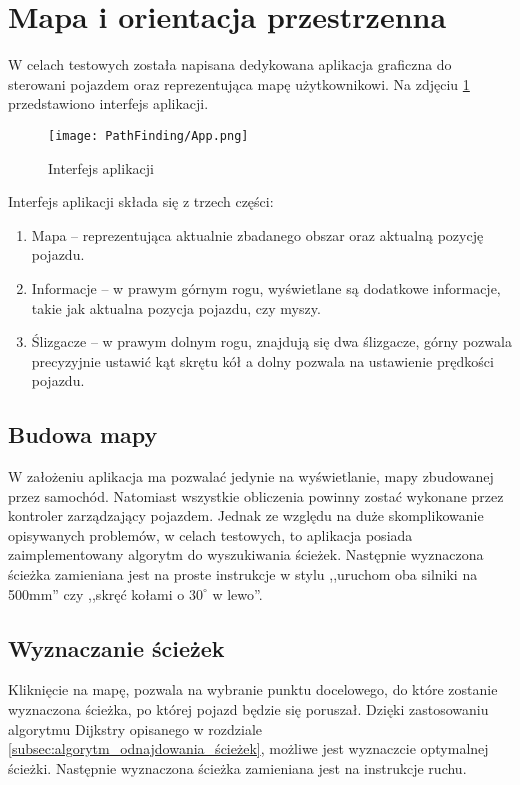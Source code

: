 \section{Mapa i orientacja przestrzenna}
    W celach testowych została napisana dedykowana aplikacja graficzna do sterowani pojazdem oraz reprezentująca mapę użytkownikowi.
    Na zdjęciu \ref{fig:app} przedstawiono interfejs aplikacji.
    \begin{figure}[!ht]
        \centering
        \texttt{[image: PathFinding/App.png]}
        \caption{Interfejs aplikacji}
        \label{fig:app}
    \end{figure}
    Interfejs aplikacji składa się z trzech części:
    \begin{enumerate}
        \item Mapa -- reprezentująca aktualnie zbadanego obszar oraz aktualną pozycję pojazdu.
        \item Informacje -- w prawym górnym rogu, wyświetlane są dodatkowe informacje, takie jak aktualna pozycja pojazdu, czy myszy.
        \item Ślizgacze -- w prawym dolnym rogu, znajdują się dwa ślizgacze, górny pozwala precyzyjnie ustawić kąt skrętu kół a dolny pozwala na ustawienie prędkości pojazdu.
    \end{enumerate}

    \subsection{Budowa mapy}
        W założeniu aplikacja ma pozwalać jedynie na wyświetlanie, mapy zbudowanej przez samochód.
        Natomiast wszystkie obliczenia powinny zostać wykonane przez kontroler zarządzający pojazdem.
        Jednak ze względu na duże skomplikowanie opisywanych problemów, w celach testowych, to aplikacja posiada zaimplementowany algorytm do wyszukiwania ścieżek.
        Następnie wyznaczona ścieżka zamieniana jest na proste instrukcje w stylu ,,uruchom oba silniki na 500mm'' czy ,,skręć kołami o $30^\circ$ w lewo''.




    \subsection{Wyznaczanie ścieżek}
        Kliknięcie na mapę, pozwala na wybranie punktu docelowego, do które zostanie wyznaczona ścieżka, po której pojazd będzie się poruszał.
        Dzięki zastosowaniu algorytmu Dijkstry opisanego w rozdziale \ref{subsec:algorytm_odnajdowania_ścieżek}, możliwe jest wyznaczcie optymalnej ścieżki.
        Następnie wyznaczona ścieżka zamieniana jest na instrukcje ruchu.

